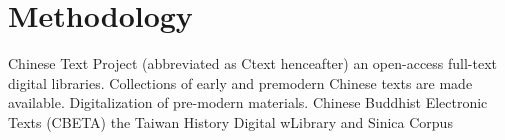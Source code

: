 
    \chapter{Methodology}%
    Chinese Text Project (abbreviated as Ctext henceafter) 
    an open-access full-text digital libraries. Collections of early and pre\-modern Chinese texts are made available. Digitalization of pre-modern materials. 
    Chinese Buddhist \cite{vanhove2008polysemy} Electronic Texts (CBETA) \cite{ctext}
    the Taiwan History Digital wLibrary 
    and Sinica Corpus 
